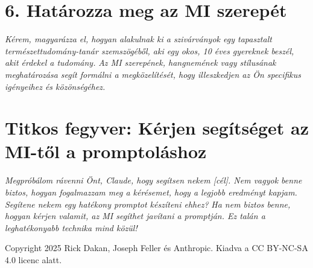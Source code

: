 \documentclass[a4paper, 12pt]{article}
\begin{document}
\section*{6. Határozza meg az MI szerepét}
\textit{Kérem, magyarázza el, hogyan alakulnak ki a szivárványok egy tapasztalt természettudomány-tanár szemszögéből, aki egy okos, 10 éves gyereknek beszél, akit érdekel a tudomány.}
\textit{Az MI szerepének, hangnemének vagy stílusának meghatározása segít formálni a megközelítését, hogy illeszkedjen az Ön specifikus igényeihez és közönségéhez.}

\section*{Titkos fegyver: Kérjen segítséget az MI-től a promptoláshoz}
\textit{Megpróbálom rávenni Önt, Claude, hogy segítsen nekem [cél]. Nem vagyok benne biztos, hogyan fogalmazzam meg a kérésemet, hogy a legjobb eredményt kapjam. Segítene nekem egy hatékony promptot készíteni ehhez?}
\textit{Ha nem biztos benne, hogyan kérjen valamit, az MI segíthet javítani a promptján. Ez talán a leghatékonyabb technika mind közül!}

\vspace{\fill}
\begin{center}
    \small{Copyright 2025 Rick Dakan, Joseph Feller és Anthropic. Kiadva a CC BY-NC-SA 4.0 licenc alatt.}
\end{center}
\end{document}
